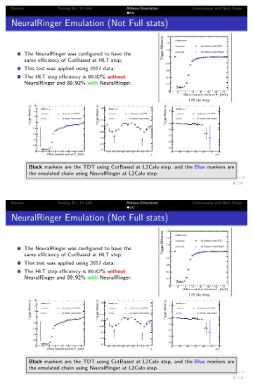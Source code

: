 \begin{figure}[htb]
\begin{center}
\begin{subfigure}[c]{.48\textwidth}
\centering
\includegraphics[width=\textwidth]{appendices/figures/low_et/e5_lhloose_et}
\caption{}
\label{fig:lowet_comp_et}
\end{subfigure}
\hfill
\begin{subfigure}[c]{.48\textwidth}
\centering
\includegraphics[width=\textwidth]{appendices/figures/low_et/e5_lhloose_eta}
\caption{}
\label{fig:lowet_comp_eta}
\end{subfigure} \\
\begin{subfigure}[c]{.48\textwidth}

\end{subfigure}
\end{center}
\end{figure}
